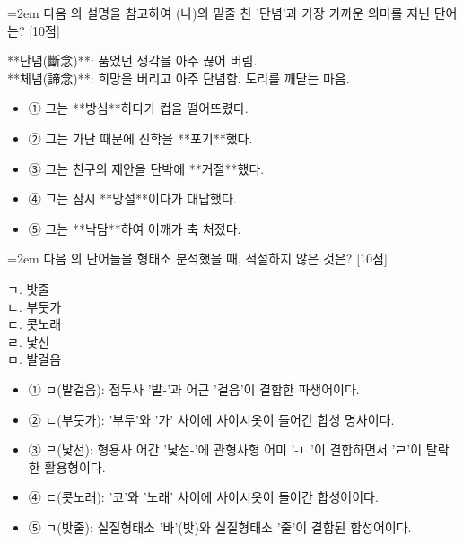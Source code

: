 \documentclass[10pt,a4paper]{article}
\newcommand{\qnum}[1]{%
  \tikz[baseline=(num.base)]{%
    \node[circle, fill=numCircle, text=white, inner sep=0pt,
          minimum size=18pt, font=\small\bfseries] (num) {#1};%
  }%
}
\newcommand{\pts}[1]{%
  \hfill\textcolor{ptsBadge}{[#1점]}%
}
\begin{document}
\vspace{4mm}
\begin{minipage}{\columnwidth}
{\hangindent=2em
\qnum{3}\enspace 다음 의 설명을 참고하여 (나)의 밑줄 친 '단념'과 가장 가까운 의미를 지닌 단어는? \pts{10}
\par}

\vspace{3mm}
\begin{tcolorbox}[bogi]
**단념(斷念)**: 품었던 생각을 아주 끊어 버림. \\{}
**체념(諦念)**: 희망을 버리고 아주 단념함. 도리를 깨닫는 마음.
\end{tcolorbox}
\vspace{3mm}
\begin{itemize}[leftmargin=2.5em, labelsep=0.3em, label={}, itemsep=4pt, parsep=1pt, topsep=0pt]
  \item ① 그는 **방심**하다가 컵을 떨어뜨렸다.
  \item ② 그는 가난 때문에 진학을 **포기**했다.
  \item ③ 그는 친구의 제안을 단박에 **거절**했다.
  \item ④ 그는 잠시 **망설**이다가 대답했다.
  \item ⑤ 그는 **낙담**하여 어깨가 축 처졌다.
\end{itemize}
\end{minipage}
\vspace{4mm}

\vspace{4mm}
\begin{minipage}{\columnwidth}
{\hangindent=2em
\qnum{4}\enspace 다음 의 단어들을 형태소 분석했을 때, 적절하지 않은 것은? \pts{10}
\par}

\vspace{3mm}
\begin{tcolorbox}[bogi]
ㄱ. 밧줄 \\{}
ㄴ. 부둣가 \\{}
ㄷ. 콧노래 \\{}
ㄹ. 낯선 \\{}
ㅁ. 발걸음
\end{tcolorbox}
\vspace{3mm}
\begin{itemize}[leftmargin=2.5em, labelsep=0.3em, label={}, itemsep=4pt, parsep=1pt, topsep=0pt]
  \item ① ㅁ(발걸음): 접두사 '발-'과 어근 '걸음'이 결합한 파생어이다.
  \item ② ㄴ(부둣가): '부두'와 '가' 사이에 사이시옷이 들어간 합성 명사이다.
  \item ③ ㄹ(낯선): 형용사 어간 '낯설-'에 관형사형 어미 '-ㄴ'이 결합하면서 'ㄹ'이 탈락한 활용형이다.
  \item ④ ㄷ(콧노래): '코'와 '노래' 사이에 사이시옷이 들어간 합성어이다.
  \item ⑤ ㄱ(밧줄): 실질형태소 '바'(밧)와 실질형태소 '줄'이 결합된 합성어이다.
\end{itemize}
\end{minipage}
\vspace{4mm}
\end{document}
